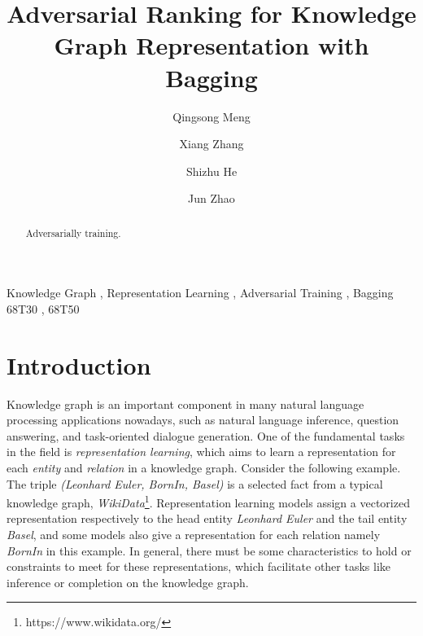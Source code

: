 \documentclass[twocolumn,a4paper,10pt,review,3p]{elsarticle}
\begin{document}

\begin{frontmatter}

\title{Adversarial Ranking for Knowledge Graph Representation with Bagging}


\author[hrbaddress]{Qingsong Meng}

\author[ucasaddress,hrbaddress]{Xiang Zhang}

\author[ucasaddress]{Shizhu He}

\author[ucasaddress]{Jun Zhao}

\address[hrbaddress]{Harbin University of Science and Technology, No.52 Xuefu Road, Nangang District, Harbin, 150080, China}
\address[ucasaddress]{University of Chinese Academy of Sciences, No.19(A) Yuquan Road, Shijingshan District, Beijing, P.R.China 100049}


\begin{abstract}
Adversarially training.
\end{abstract}

\begin{keyword}
Knowledge Graph \sep{} Representation Learning \sep{} Adversarial Training \sep{} Bagging
\MSC[2010] 68T30 \sep{} 68T50
\end{keyword}

\end{frontmatter}


\linenumbers{}


\section{Introduction}

Knowledge graph is an important component in many natural language processing applications nowadays, such as natural language inference, question answering, and task-oriented dialogue generation. One of the fundamental tasks in the field is \emph{representation learning}, which aims to learn a representation for each \emph{entity} and \emph{relation} in a knowledge graph. Consider the following example. The triple \emph{(Leonhard Euler, BornIn, Basel)} is a selected fact from a typical knowledge graph, \emph{WikiData}\footnote{https://www.wikidata.org/}. Representation learning models assign a vectorized representation respectively to the head entity \emph{Leonhard Euler} and the tail entity \emph{Basel}, and some models also give a representation for each relation namely \emph{BornIn} in this example. In general, there must be some characteristics to hold or constraints to meet for these representations, which facilitate other tasks like inference or completion on the knowledge graph.
\end{document}
